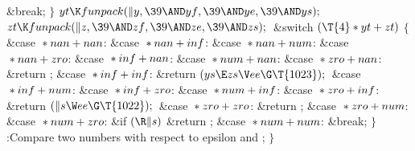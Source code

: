 \&{break};\6
\4${}\}{}$\2\6
${}\\{yt}\K\\{funpack}(\|y,\39{\AND}\\{yf},\39{\AND}\\{ye},\39{\AND}\\{ys});{}$%
\6
${}\\{zt}\K\\{funpack}(\|z,\39{\AND}\\{zf},\39{\AND}\\{ze},\39{\AND}\\{zs});{}$%
\6
\&{switch} ${}(\T{4}*\\{yt}+\\{zt}){}$\5
${}\{{}$\1\6
\4\&{case} ${}*\\{nan}+\\{nan}{}$:\5
\&{case} ${}*\\{nan}+\\{inf}{}$:\5
\&{case} ${}*\\{nan}+\\{num}{}$:\5
\&{case} ${}*\\{nan}+\\{zro}{}$:\5
\&{case} ${}*\\{inf}+\\{nan}{}$:\5
\&{case} ${}*\\{num}+\\{nan}{}$:\5
\&{case} ${}*\\{zro}+\\{nan}{}$:\5
\&{return} ;\6
\4\&{case} ${}*\\{inf}+\\{inf}{}$:\5
\&{return} ${}(\\{ys}\E\\{zs}\V\\{ee}\G\T{1023});{}$\6
\4\&{case} ${}*\\{inf}+\\{num}{}$:\5
\&{case} ${}*\\{inf}+\\{zro}{}$:\5
\&{case} ${}*\\{num}+\\{inf}{}$:\5
\&{case} ${}*\\{zro}+\\{inf}{}$:\5
\&{return} ${}(\|s\W\\{ee}\G\T{1022});{}$\6
\4\&{case} ${}*\\{zro}+\\{zro}{}$:\5
\&{return} ;\6
\4\&{case} ${}*\\{zro}+\\{num}{}$:\5
\&{case} ${}*\\{num}+\\{zro}{}$:\5
\&{if} ${}(\R\|s){}$\1\5
\&{return} ;\2\6
\4\&{case} ${}*\\{num}+\\{num}{}$:\5
\&{break};\6
\4${}\}{}$\2\6
:Compare two numbers with respect to epsilon and \X;\6
\4${}\}{}$\2\par
\fi

